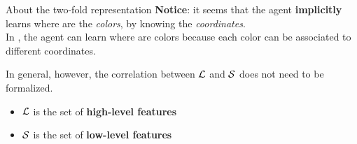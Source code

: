 \documentclass{beamer}
\begin{document}
\begin{frame}{About the two-fold representation}
	\textbf{Notice}: it seems that the agent \textbf{implicitly} learns where are the \emph{colors}, by knowing the \emph{coordinates}.\\
	
	\vspace{0.3cm}
	In \Sapientino, the agent can learn where are colors because each color can be associated to different coordinates.
	
	\vspace{0.3cm}
	In general, however, the correlation between $\L$ and $\S$ does not need to be formalized.
	\begin{itemize}
		\item $\L$ is the set of \textbf{high-level features}
		\item $\S$ is the set of \textbf{low-level features}
	\end{itemize}
	
	
\end{frame}
\end{document}
